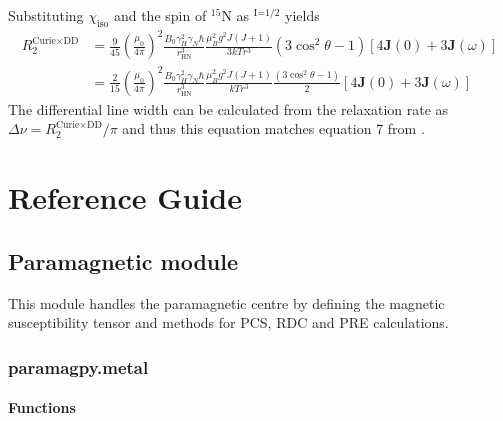 \documentclass[a4paper,10pt,english,openany,oneside]{sphinxmanual}
\begin{document}
Substituting \(\chi_\text{iso}\) and the spin of $^{\text{15}}$N as $^{\text{I=1/2}}$ yields
\begin{equation*}
\begin{split}R_2^\text{Curie$\times$DD}&=\frac{9}{45} \left(\frac{\mu_0}{4\pi}\right)^2 \frac{B_0\gamma_H^2\gamma_N\hbar}{r_\text{HN}^3} \frac{\mu_B^2g^2J(J+1)}{3 k T r^3}(3\cos^2{\theta}-1)\left[4\mathbf{J}(0) + 3\mathbf{J}(\omega)\right]\\
&=\frac{2}{15} \left(\frac{\mu_0}{4\pi}\right)^2 \frac{B_0\gamma_H^2\gamma_N\hbar}{r_\text{HN}^3} \frac{\mu_B^2g^2J(J+1)}{k T r^3}\frac{(3\cos^2{\theta}-1)}{2}\left[4\mathbf{J}(0) + 3\mathbf{J}(\omega)\right]\end{split}
\end{equation*}
The differential line width can be calculated from the relaxation rate as \(\Delta\nu = R_2^\text{Curie$\times$DD}/\pi\) and thus this equation matches equation 7 from .


\section{Reference Guide}
\label{\detokenize{reference/index:reference-guide}}\label{\detokenize{reference/index:reference-index}}\label{\detokenize{reference/index::doc}}

\subsection{Paramagnetic module}
\label{\detokenize{reference/index:paramagnetic-module}}
This module handles the paramagnetic centre by defining the magnetic susceptibility
tensor and methods for PCS, RDC and PRE calculations.


\subsubsection{paramagpy.metal}
\label{\detokenize{reference/metal:module-paramagpy.metal}}\label{\detokenize{reference/metal:paramagpy-metal}}\label{\detokenize{reference/metal:metal}}\label{\detokenize{reference/metal::doc}}

\paragraph{Functions}
\label{\detokenize{reference/metal:functions}}
\end{document}
